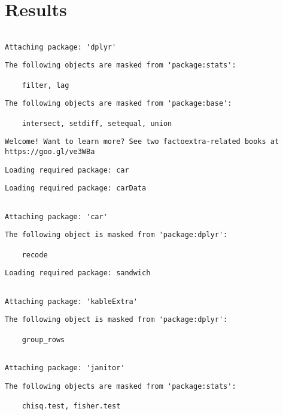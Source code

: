 \documentclass[12pt,twoside]{reedthesis}
\begin{document}
\hypertarget{results}{%
\chapter{Results}\label{results}}
\begin{verbatim}

Attaching package: 'dplyr'
\end{verbatim}
\begin{verbatim}
The following objects are masked from 'package:stats':

    filter, lag
\end{verbatim}
\begin{verbatim}
The following objects are masked from 'package:base':

    intersect, setdiff, setequal, union
\end{verbatim}
\begin{verbatim}
Welcome! Want to learn more? See two factoextra-related books at https://goo.gl/ve3WBa
\end{verbatim}
\begin{verbatim}
Loading required package: car
\end{verbatim}
\begin{verbatim}
Loading required package: carData
\end{verbatim}
\begin{verbatim}

Attaching package: 'car'
\end{verbatim}
\begin{verbatim}
The following object is masked from 'package:dplyr':

    recode
\end{verbatim}
\begin{verbatim}
Loading required package: sandwich
\end{verbatim}
\begin{verbatim}

Attaching package: 'kableExtra'
\end{verbatim}
\begin{verbatim}
The following object is masked from 'package:dplyr':

    group_rows
\end{verbatim}
\begin{verbatim}

Attaching package: 'janitor'
\end{verbatim}
\begin{verbatim}
The following objects are masked from 'package:stats':

    chisq.test, fisher.test
\end{verbatim}
\end{document}
